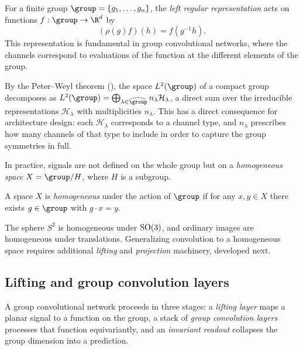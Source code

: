 \begin{example}
\label{ex:groups:regular-representation}
For a finite group $\group = \{g_1, \dots, g_n\}$, the \emph{left regular
representation} acts on functions $f: \group \to \R^d$ by
\begin{equation}
  (\rho(g) f)(h) = f(g^{-1} h).
\end{equation}
This representation is fundamental in group convolutional networks, where the
channels correspond to evaluations of the function at the different elements of
the group.
\end{example}

By the Peter--Weyl theorem (), the space $L^2(\group)$ of a
compact group decomposes as $L^2(\group) = \bigoplus_{\lambda \in \widehat
\group} n_\lambda \mathcal{H}_\lambda$, a direct sum over the irreducible
representations $\mathcal{H}_\lambda$ with multiplicities $n_\lambda$. This has a
direct consequence for architecture design: each $\mathcal{H}_\lambda$
corresponds to a channel type, and $n_\lambda$ prescribes how many channels of
that type to include in order to capture the group symmetries in full.

In practice, signals are not defined on the whole group but on a
\emph{homogeneous space} $X = \group / H$, where $H$ is a subgroup.

\begin{definition}
\label{def:groups:homogeneous-space}
A space $X$ is \emph{homogeneous} under the action of $\group$ if for any
$x, y \in X$ there exists $g \in \group$ with $g \cdot x = y$.
\end{definition}

The sphere $S^2$ is homogeneous under $\operatorname{SO}(3)$, and ordinary images are
homogeneous under translations. Generalizing convolution to a homogeneous space
requires additional \emph{lifting} and \emph{projection} machinery, developed
next.

\subsection{Lifting and group convolution layers}
\label{sec:groups:lifting}

A group convolutional network proceeds in three stages: a \emph{lifting layer}
maps a planar signal to a function on the group, a stack of \emph{group
convolution layers} processes that function equivariantly, and an
\emph{invariant readout} collapses the group dimension into a prediction.

